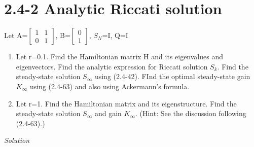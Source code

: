 \documentclass{article}
\begin{document}
  \section{2.4-2 Analytic Riccati solution}
  Let A=$
  \begin{bmatrix}
	  1 & 1 \\
	  0 & 1
  \end{bmatrix}$, B=$
  \begin{bmatrix}
	  0 \\
	  1
  \end{bmatrix}$, $S_N$=I, Q=I

  \begin{enumerate}[label=(\alph*)]
    \item Let r=0.1. Find the Hamiltonian matrix H and its eigenvalues and eigenvectors. Find the analytic expression for Riccati solution $S_k$. Find the steady-state solution
	    $S_{\infty}$ using (2.4-42). FInd the optimal steady-state gain $K_{\infty}$ using (2.4-63) and also using Ackermann's formula.
    \item Let r=1. Find the Hamiltonian matrix and its eigenstructure. Find the steady-state solution $S_{\infty}$ and gain $K_{\infty}$. (Hint: See the discussion following (2.4-63).)
  \end{enumerate}

  \noindent \textit{Solution} \newline \newline
\end{document}
